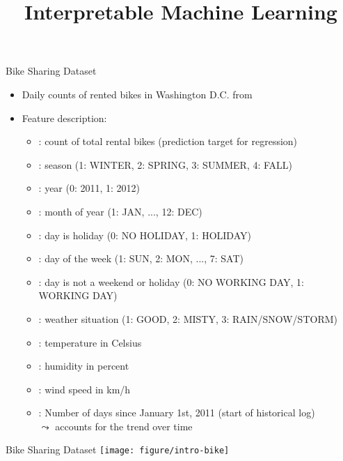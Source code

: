 \documentclass[11pt,compress,t,notes=noshow, aspectratio=169, xcolor=table]{beamer}
\title{Interpretable Machine Learning}
\date{}
\begin{document}
\newcommand{\titlefigure}{figure/open_blackbox}
\newcommand{\learninggoals}{
\item Introduce bike sharing data
\item Description of features
\item EDA of features}


\begin{frame}[t]{Bike Sharing Dataset }
\begin{itemize}
\item Daily counts of rented bikes in Washington D.C. from 
\item Feature description:
\begin{itemize}
\item {}: count of total rental bikes (prediction target for regression)
\item {}: season (1: WINTER, 2: SPRING, 3: SUMMER, 4: FALL)
\item {}: year (0: 2011, 1: 2012)
\item {}: month of year (1: JAN, ..., 12: DEC)
\item {}: day is holiday (0: NO HOLIDAY, 1: HOLIDAY)
\item {}: day of the week (1: SUN, 2: MON, ..., 7: SAT)
\item {}: day is not a weekend or holiday (0: NO WORKING DAY, 1: WORKING DAY)
\item {}: weather situation (1: GOOD, 2: MISTY, 3: RAIN/SNOW/STORM)
\item {}: temperature in Celsius
\item {}: humidity in percent
\item {}: wind speed in km/h
\item {}: Number of days since January 1st, 2011 (start of historical log)\\
$\leadsto$ accounts for the trend over time
\end{itemize}
\end{itemize}
\end{frame}


\begin{frame}[t]{Bike Sharing Dataset}
\texttt{[image: figure/intro-bike]}
\end{frame}

\endlecture
\end{document}
